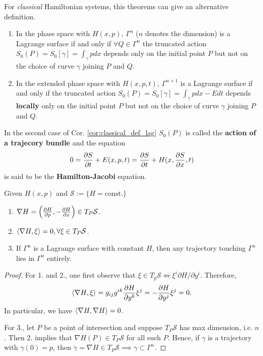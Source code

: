 For \emph{classical} Hamiltonian systems, this theorems can give an alternative definition.
\begin{corollary}
	\begin{enumerate}
		\item In the phase space with $H(x, p)$, $\Gamma^n$ ($n$ denotes the dimension) is a Lagrange surface if and only if $\forall Q \in \Gamma^n$ the truncated action $S_0(P) = S_0[\gamma] = \int_{\gamma} pdx$ depends only on the initial point $P$ but not on the choice of curve $\gamma$ joining $P$ and $Q$.
		\item In the extended phase space with $H(x, p, t)$, $\Gamma^{n+1}$ is a Lagrange surface if and only if the truncated action $S_0(P) = S_0[\gamma] = \int_{\gamma} pdx -Edt$ depends \textbf{locally} only on the initial point $P$ but not on the choice of curve $\gamma$ joining $P$ and $Q$.
	\end{enumerate}
	\label{cor:classical_def_lag}
\end{corollary}

\begin{definition}
	In the second case of Cor. \ref{cor:classical_def_lag} $S_0(P)$ is called the \textbf{action of a trajecory bundle} and the equation
	\begin{eqnarray}
		0 = \frac{ \partial S}{ \partial t } + E(x, p, t) = \frac{ \partial S}{ \partial t } + H(x, \frac{ \partial S}{ \partial x }, t)
	\end{eqnarray}
	is said to be the \textbf{Hamilton-Jacobi} equation. 
\end{definition}

\begin{theorem}
	Given $H(x, p)$ and $\mathcal{S} := \{H = \text{const.}\}$
	\begin{enumerate}
		\item $\nabla H = \left( \frac{ \partial H}{ \partial p }, -\frac{ \partial H}{ \partial x } \right) \in T_P \mathcal{S}$.
		\item $\left< \nabla H, \xi \right> = 0, \forall \xi \in T_P \mathcal{S}$.
		\item If $\Gamma^n$ is a Lagrange surface with constant $H$, then any trajectory touching $\Gamma^n$ lies in $\Gamma^n$ entirely.
	\end{enumerate}
\end{theorem}
\begin{proof}
	For 1. and 2., one first observe that $\xi \in T_p\mathcal{S} \iff \xi^i \partial H / \partial y^i$. Therefore, \[ \left< \nabla H, \xi \right> = g_{ij} g^{ik}\frac{ \partial H}{ \partial y^k } \xi^j = -  \frac{ \partial H}{ \partial y^j }\xi^j = 0. \]
	In particular, we have $\left< \nabla H, \nabla H \right> = 0$.
	
	For 3., let $P$ be a point of intersection and suppose $T_P\mathcal{S}$ has max dimension, i.e. $n$. Then 2. implies that $\nabla H(P) \in T_P\mathcal{S} $ for all such $P$. Hence, if $\gamma$ is a trajectory with $\gamma(0) = p$, then $\dot{\gamma} = \nabla H \in T_P\mathcal{S} \implies \gamma \subset \Gamma^n.$
\end{proof}

